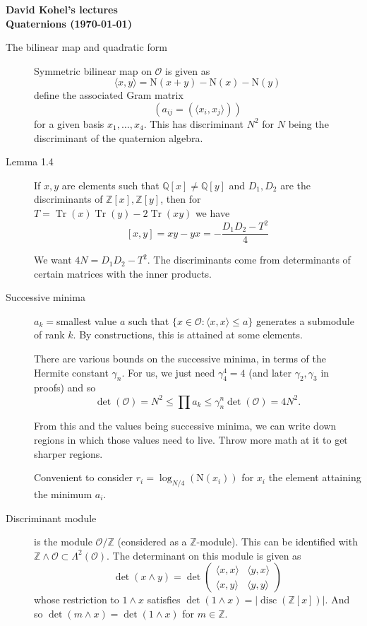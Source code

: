 \documentclass[12pt]{report}
\newcommand{\Q}{\mathbb{Q}}
\newcommand{\Z}{\mathbb{Z}}
\newcommand\norm[1]{\mathrm{N}(#1)}
\newcommand{\Tr}{\operatorname{Tr}}
\renewcommand{\O}{\mathcal{O}}
\newcommand{\disc}{\operatorname{disc}}
\begin{document}
\sloppy

\centerline{\Large\bf David Kohel's lectures  \\  Quaternions (\today)}

\smallskip


\begin{description}
\item[The bilinear map and quadratic form]
Symmetric bilinear map on $\O$ is given as  \[\langle x, y \rangle = \norm{x+y}-\norm{x}-\norm{y}\] 
define the associated Gram matrix
\[ (a_{ij} = (\langle x_i, x_j \rangle ))\]
for a given basis $x_1, \dots, x_4$. This has discriminant $N^2$ for $N$ being the discriminant of the quaternion algebra.

\item[Lemma 1.4] If $x, y$ are elements such that $\Q[x] \neq \Q[y]$ and $D_1, D_2$ are the discriminants of $\Z[x], \Z[y]$, then for $T = \Tr(x)\Tr(y) - 2 \Tr(xy)$ we have
\[ [x,y] = xy - yx = - \frac{D_1D_2 -T^2 }{4}\]

We want $4N = D_1 D_2 - T^2 $. The discriminants come from determinants of certain matrices with the inner products. 


\item[Successive minima] $a_k = $smallest value $a$ such that $\{ x \in \O : \langle x,x \rangle \leq a \}$ generates a submodule of rank $k$. By constructions, this is attained at some elements. 

There are various bounds on the successive minima, in terms of the Hermite constant $\gamma_n$. For us, we just need $\gamma_4^4=  4$ (and later $\gamma_2, \gamma_3$ in proofs) and so \[ \det(\O) = N^2 \leq \prod a_k \leq \gamma_n^n \det(\O) = 4  N^2 .\] 

From this and the values being successive minima, we can write down regions in which those values need to live. Throw more math at it to get sharper regions.

 Convenient to consider $r_i = \log_{N/4}(\norm{x_i})$ for $x_i$ the element attaining the minimum $a_i$.
 
 \item[Discriminant module] is the module $\O / \Z$ (considered as a $\Z$-module). This can be identified with $\Z \wedge \O \subset \Lambda^2 (\O)$. The determinant on this module is given as 
 \[ \det(x \wedge y) = \det \left( \begin{matrix}
 \langle x, x \rangle & \langle y,x \rangle \\ \langle x, y \rangle & \langle y, y \rangle
\end{matrix}  \right) \]
whose restriction to $1 \wedge x $ satisfies $\det(1 \wedge x ) = |\disc(\Z[x])|$. And so $\det(m \wedge x) = \det(1 \wedge x)$ for $m \in \Z$. 


\end{description}
\end{document}
